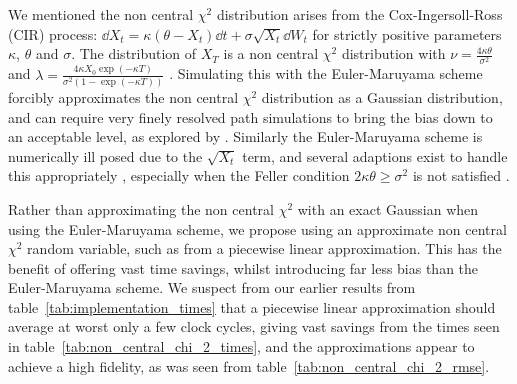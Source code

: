 \documentclass[manuscript,review]{acmart}
\begin{document}
We mentioned the non central $ \chi^2 $ distribution arises from the Cox-Ingersoll-Ross (CIR) process: $ \dd{X_t} = \kappa (\theta - X_t) \dd{t} + \sigma \sqrt{X_t} \dd{W_t} $ for strictly positive parameters $ \kappa $, $ \theta $ and $ \sigma $. The distribution of $ X_T $ is a non central $ \chi^2 $ distribution with $ \nu = \tfrac{4\kappa\theta}{\sigma^2} $ and $ \lambda = \tfrac{4\kappa X_0 \exp(-\kappa T)}{\sigma^2(1 - \exp(-\kappa T))} $ \citep{cox1985theory} \citep[pages~67--68]{munk2011fixed}. Simulating this with the Euler-Maruyama scheme forcibly approximates the non central $ \chi^2 $ distribution as a Gaussian distribution, and can require very finely resolved path simulations to bring the bias down to an acceptable level, as explored by \citet{broadie2006exact}. Similarly the Euler-Maruyama scheme is numerically ill posed due to the $ \sqrt{X_t} $ term, and several adaptions exist to handle this appropriately \citep{deelstra1998convergence,lord2010comparison,berkaoui2008euler,higham2002strong,alfonsi2005discretization,alfonsi2008second,alfonsi2010high,dereich2012euler,cozma2020strong_euler,gyongy2011note}, especially when the Feller condition $ 2\kappa\theta \geq \sigma^2 $ is not satisfied \citep{feller1951two,gyongy1998note}.

Rather than approximating the non central $ \chi^2 $ with an exact Gaussian when using the Euler-Maruyama scheme, we propose using an approximate non central $ \chi^2 $ random variable, such as from a piecewise linear approximation. This has the benefit of offering vast time savings, whilst introducing far less bias than the Euler-Maruyama scheme. We suspect from our earlier results from table~\ref{tab:implementation_times} that a piecewise linear approximation should average at worst only a few clock cycles, giving vast savings from the times seen in table~\ref{tab:non_central_chi_2_times}, and the approximations appear to achieve a high fidelity, as was seen from table~\ref{tab:non_central_chi_2_rmse}.
\end{document}
